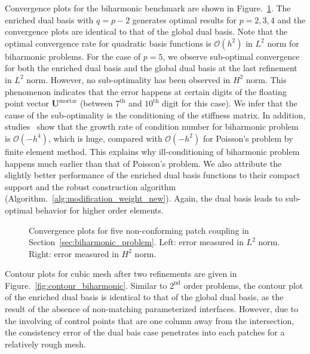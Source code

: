 Convergence plots for the biharmonic benchmark are shown in Figure.~\ref{fig:convergence_biharmonic}. The enriched dual basis with $q=p-2$ generates optimal results for $p=2,3,4$ and the convergence plots are identical to that of the global dual basis. Note that the optimal convergence rate for quadratic basis functions is $\mathcal{O}(h^2)$ in $L^2$ norm for biharmonic problems. For the case of $p=5$, we observe sub-optimal convergence for both the enriched dual basis and the global dual basis at the last refinement in $L^2$ norm. However, no sub-optimality has been observed in $H^2$ norm. This phenomenon indicates that the error happens at certain digits of the floating point vector $\mathbf{U}^\text{mortar}$ (between $7^\text{th}$ and $10^\text{th}$ digit for this case). We infer that the cause of the sub-optimality is the conditioning of the stiffness matrix. In addition, studies~\cite{li2008effective} show that the growth rate of condition number for biharmonic problem is $\mathcal{O}(-h^4)$, which is huge, compared with $\mathcal{O}(-h^2)$ for Poisson's problem by finite element method. This explains why ill-conditioning of biharmonic problem happens much earlier than that of Poisson's problem. We also attribute the slightly better performance of the enriched dual basis functions to their compact support and the robust construction algorithm (Algorithm.~\ref{alg:modification_weight_new}). Again, the \Bezier dual basis leads to sub-optimal behavior for higher order elements.\par

\begin{figure}[ht]
	\center
	\captionsetup[subfigure]{labelformat=empty}
	\begin{subfigure}{.45\textwidth}
		\center
		
	\end{subfigure}\hspace{2mm}
	\begin{subfigure}{.45\textwidth}
		\center
		
	\end{subfigure}
	\caption{Convergence plots for five non-conforming patch coupling in Section~\ref{sec:biharmonic_problem}. Left: error measured in $L^2$ norm. Right: error measured in $H^2$ norm.}\label{fig:convergence_biharmonic}
\end{figure}

Contour plots for cubic mesh after two refinements are given in Figure.~\ref{fig:contour_biharmonic}. Similar to $2^\text{nd}$ order problems, the contour plot of the enriched dual basis is identical to that of the global dual basis, as the result of the absence of non-matching parameterized interfaces. However, due to the involving of control points that are one column away from the intersection, the consistency error of the \Bezier dual bais case penetrates into each patches for a relatively rough mesh.

